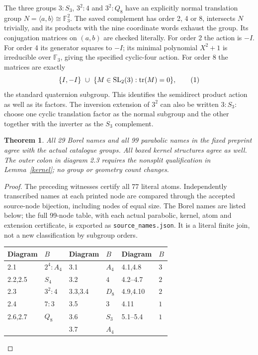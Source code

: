 \documentclass[11pt]{article}
\newtheorem{theorem}{Theorem}\newtheorem{lemma}[theorem]{Lemma}
\begin{document}
The three groups $3:S_3$, $3^2:4$ and $3^2:Q_8$ have an explicitly
normal translation group $N=\langle a,b\rangle\cong\mathbb F_3^2$.
The saved complement has order 2, 4 or 8, intersects $N$ trivially,
and its products with the nine coordinate words exhaust the group.
Its conjugation matrices on $(a,b)$ are checked literally. For order 2
the action is $-I$. For order 4 its generator squares to $-I$; its
minimal polynomial $X^2+1$ is irreducible over $\mathbb F_3$, giving
the specified cyclic-four action. For order 8 the matrices are exactly
\[
 \{I,-I\}\ \cup\
 \{M\in\operatorname{SL}_2(3):\operatorname{tr}(M)=0\},                 \tag{1}
\]
the standard quaternion subgroup. This identifies the semidirect
product action as well as its factors. The inversion extension of
$3^2$ can also be written $3:S_3$: choose one cyclic translation factor
as the normal subgroup and the other together with the inverter as
the $S_3$ complement.

\begin{theorem}\label{names}
All 29 Borel names and all 99 parabolic names in the fixed preprint agree
with the actual catalogue groups. All boxed kernel structures agree as
well. The outer colon in diagram 2.3 requires the nonsplit qualification
in Lemma~\ref{kernel}; no group or geometry count changes.
\end{theorem}
\begin{proof}
The preceding witnesses certify all 77 literal atoms. Independently
transcribed names at each printed node are compared through the accepted
source-node bijection, including nodes of equal size. The Borel names
are listed below; the full 99-node table, with each actual parabolic,
kernel, atom and extension certificate, is exported as
\texttt{source\_names.json}. It is a literal finite join, not a new
classification by subgroup orders.
\begin{center}\small
\begin{tabular}{@{}ll@{\qquad}ll@{\qquad}ll@{}}
\toprule Diagram&$B$&Diagram&$B$&Diagram&$B$\\\midrule
2.1&$2^4:A_4$&3.1&$A_4$&4.1,4.8&$3$\\
2.2,2.5&$S_4$&3.2&$4$&4.2--4.7&$2$\\
2.3&$3^2:4$&3.3,3.4&$D_8$&4.9,4.10&$2$\\
2.4&$7:3$&3.5&$3$&4.11&$1$\\
2.6,2.7&$Q_8$&3.6&$S_3$&5.1--5.4&$1$\\
&&3.7&$A_4$&&\\\bottomrule
\end{tabular}
\end{center}
\end{proof}
\end{document}
